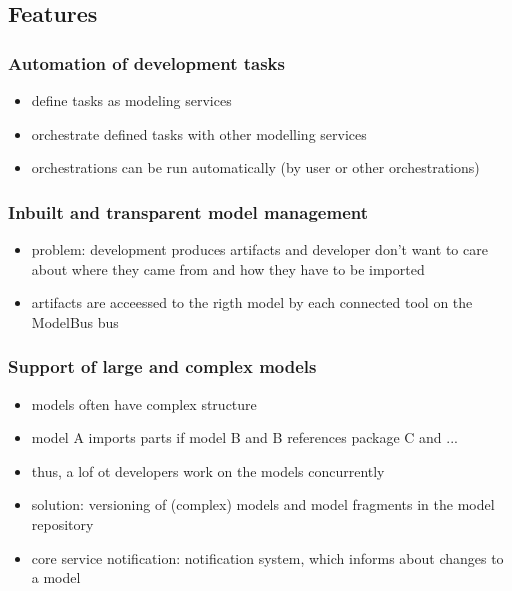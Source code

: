 \subsection{Features}

\subsubsection{Automation of development tasks}

\begin{itemize}
\item define tasks as modeling services
\item orchestrate defined tasks with other modelling services
\item orchestrations can be run automatically (by user or other orchestrations)
\end{itemize}

\subsubsection{Inbuilt and transparent model management}

\begin{itemize}
\item problem: development produces artifacts and developer don't want to care about where they came from and how they have to be imported
\item artifacts are acceessed to the rigth model by each connected tool on the ModelBus bus
\end{itemize}

\subsubsection{Support of large and complex models}

\begin{itemize}
\item models often have complex structure
\item model A imports parts if model B and B references package C and ...
\item thus, a lof ot developers work on the models concurrently
\item solution: versioning of (complex) models and model fragments in the model repository
\item core service notification: notification system, which informs about changes to a model
\end{itemize}

